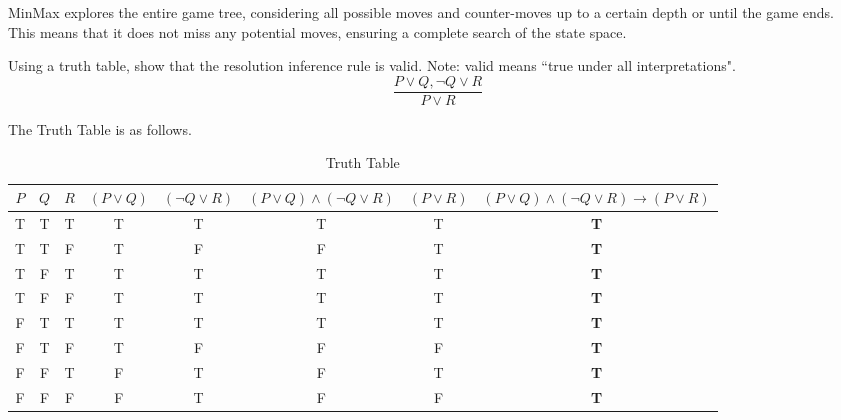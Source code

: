 \documentclass[12pt]{article}
\begin{document}
\solution
MinMax explores the entire game tree, considering all possible moves and counter-moves up to a certain depth or until the game ends.\\
This means that it does not miss any potential moves, ensuring a complete search of the state space.

\newpage
\problem Using a truth table, show that the resolution inference rule is valid. Note: valid means
``true under all interpretations".
\[\frac{P\lor Q,\lnot Q\lor R}{P\lor R}\]

\solution The Truth Table is as follows.

\begin{table}[!ht]
    \centering
    \begin{tabular}{|c|c|c||c|c|c|c||c|}
        \hline
        $P$ & $Q$ & $R$ & $(P\lor Q)$ & $(\lnot Q\lor R)$ & $(P\lor Q)\land(\lnot Q\lor R)$ & $(P\lor R)$ & $(P\lor Q)\land(\lnot Q\lor R)\rightarrow(P\lor R)$ \\ \hline
        T   & T   & T   & T           & T                 & T                               & T           & \textbf{T}                                          \\ \hline
        T   & T   & F   & T           & F                 & F                               & T           & \textbf{T}                                          \\ \hline
        T   & F   & T   & T           & T                 & T                               & T           & \textbf{T}                                          \\ \hline
        T   & F   & F   & T           & T                 & T                               & T           & \textbf{T}                                          \\ \hline
        F   & T   & T   & T           & T                 & T                               & T           & \textbf{T}                                          \\ \hline
        F   & T   & F   & T           & F                 & F                               & F           & \textbf{T}                                          \\ \hline
        F   & F   & T   & F           & T                 & F                               & T           & \textbf{T}                                          \\ \hline
        F   & F   & F   & F           & T                 & F                               & F           & \textbf{T}                                          \\ \hline
    \end{tabular}
    \caption{Truth Table}
\end{table}
\end{document}
